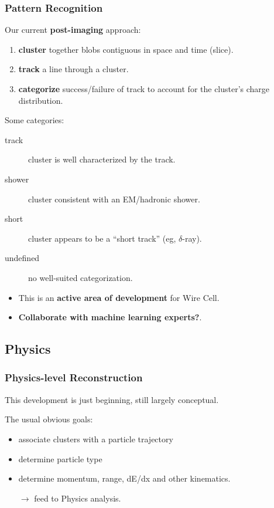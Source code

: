 \documentclass[xcolor=dvipsnames]{beamer}
\begin{document}
\begin{frame}
  \frametitle{Pattern Recognition}
  Our current \textbf{post-imaging} approach:
  \begin{enumerate}
  \item \textbf{cluster} together blobs contiguous in space and time
    (slice).
  \item \textbf{track} a line through a cluster.
  \item \textbf{categorize} success/failure of track to account for the
    cluster's charge distribution.
  \end{enumerate}
  Some categories:
  \begin{description}
  \item[track] cluster is well characterized by the track.
  \item[shower] cluster consistent with an EM/hadronic shower.
  \item[short] cluster appears to be a ``short track'' (eg, $\delta$-ray).
  \item[undefined] no well-suited categorization.
  \end{description}

  \begin{itemize}
  \item This is an \textbf{active area of development} for Wire Cell.
  \item \textbf{Collaborate with machine learning experts?}. 
  \end{itemize}

\end{frame}

\subsection{Physics}
\begin{frame}
  \frametitle{Physics-level Reconstruction}

  This development is just beginning, still largely conceptual.
  
  The usual obvious goals:
  \begin{itemize}
  \item associate clusters with a particle trajectory
  \item determine particle type
  \item determine momentum, range, dE/dx and other kinematics.
  \item[$\rightarrow$] feed to Physics analysis.
  \end{itemize}

\end{frame}
\end{document}
